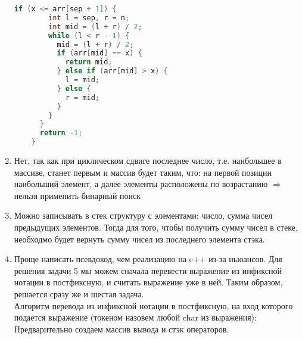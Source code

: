 \documentclass{article}
\begin{document}
\begin{enumerate}
\begin{lstlisting}[language=c++]
      if (x <= arr[sep + 1]) {
        int l = sep, r = n;
        int mid = (l + r) / 2;
        while (l < r - 1) {
          mid = (l + r) / 2;
          if (arr[mid] == x) {
            return mid;
          } else if (arr[mid] > x) {
            l = mid;
          } else {
            r = mid;
          }
        }
      }
      return -1;
    }
  \end{lstlisting}
  \item Нет, так как при циклическом сдвиге последнее число, т.е. наибольшее в массиве, станет первым и массив будет таким, что:
  на первой позиции наибольший элемент, а далее элементы расположены по возрастанию $\Longrightarrow$ нельзя применить бинарный поиск
  \item Можно записывать в стек структуру с элементами: число, сумма чисел предыдущих элементов. Тогда для того, чтобы получить сумму чисел в стеке, необходмо будет вернуть сумму чисел из последнего элемента стэка.
  \item Проще написать псевдокод, чем реализацию на c++ из-за ньюансов.
    Для решения задачи 5 мы можем сначала перевести выражение из инфиксной нотации в постфиксную, и считать выражение уже в ней.
    Таким образом, решается сразу же и шестая задача. \\
    Алгоритм перевода из инфиксной нотации в постфиксную, на вход которого подается выражение (токеном назовем любой char из выражения): \\
    Предварительно создаем массив вывода и стэк операторов.


\end{enumerate}
\end{document}
